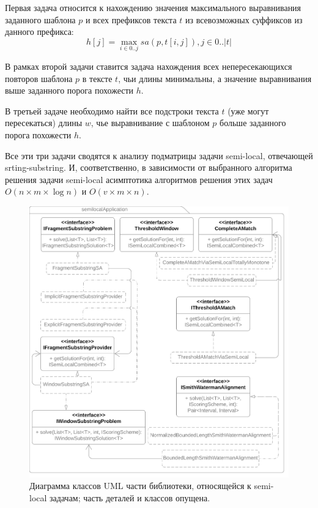 Первая задача относится к нахождению значения максимального выравнивания заданного шаблона $p$ и всех префиксов текста $t$ из всевозможных суффиксов из данного префикса:
\begin{equation}
    h[j] = \max _{i \in 0 ..j} sa(p,t[i,j]), j \in 0..|t|
\end{equation}

В рамках второй задачи ставится задача нахождения всех непересекающихся повторов шаблона $p$ в тексте $t$, чьи длины минимальны, а значение выравнивания выше заданного порога похожести $h$.

В третьей задаче необходимо найти все подстроки текста $t$ (уже могут пересекаться) длины $w$, чье выравнивание с шаблоном $p$ больше заданного порога похожести $h$.

Все эти три задачи сводятся к анализу {подматрицы} задачи 
{semi-local}, отвечающей {srting-substring}.
И, соответственно, в зависимости от выбранного алгоритма решения задачи {semi-local} асимптотика алгоритмов решения этих задач $O(n \times m \times \log n)$ и $O(v \times  m \times n)$.


\begin{figure}
    \includegraphics[width=\columnwidth]{Mishin/figures/semiLocalApplication.png}
    \caption{Диаграмма классов UML части библиотеки, относящейся к {semi-local} задачам; часть деталей и классов опущена.}\label{fig:libraryApplication}
\end{figure}


